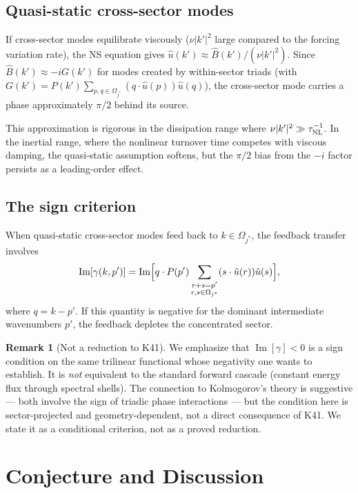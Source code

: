 \documentclass[11pt]{article}
\theoremstyle{definition}
\newtheorem{remark}[theorem]{Remark}
\DeclareMathOperator{\im}{Im}
\begin{document}
\subsection{Quasi-static cross-sector modes}

If cross-sector modes equilibrate viscously
($\nu|k'|^2$ large compared to the forcing variation
rate), the NS equation gives
$\hat u(k')\approx\hat B(k')/(\nu|k'|^2)$.  Since
$\hat B(k')\approx -iG(k')$ for modes created by
within-sector triads (with
$G(k')=P(k')\sum_{p,q\in\Omega_{j^*}}
(q\cdot\hat u(p))\hat u(q)$), the cross-sector mode
carries a phase approximately $\pi/2$ behind its source.

This approximation is rigorous in the dissipation range
where $\nu|k'|^2\gg\tau_{\rm NL}^{-1}$.  In the
inertial range, where the nonlinear turnover time
competes with viscous damping, the quasi-static
assumption softens, but the $\pi/2$ bias from the $-i$
factor persists as a leading-order effect.

\subsection{The sign criterion}

When quasi-static cross-sector modes feed back to
$k\in\Omega_{j^*}$, the feedback transfer involves
\begin{equation}
\im[\gamma(k,p')] = \im\Bigl[q\cdot P(p')
\sum_{\substack{r+s=p'\\r,s\in\Omega_{j^*}}}
(s\cdot\hat u(r))\hat u(s)\Bigr],
\end{equation}
where $q=k-p'$.  If this quantity is negative for
the dominant intermediate wavenumbers $p'$, the feedback
depletes the concentrated sector.

\begin{remark}[Not a reduction to K41]
We emphasize that $\im[\gamma]<0$ is a sign condition
on the same trilinear functional whose negativity
one wants to establish.  It is \emph{not} equivalent
to the standard forward cascade (constant energy flux
through spectral shells).  The connection to Kolmogorov's
theory is suggestive --- both involve the sign of
triadic phase interactions --- but the condition here is
sector-projected and geometry-dependent, not a direct
consequence of K41.  We state it as a conditional
criterion, not as a proved reduction.
\end{remark}

\section{Conjecture and Discussion}
\label{sec:conjecture}
\end{document}
